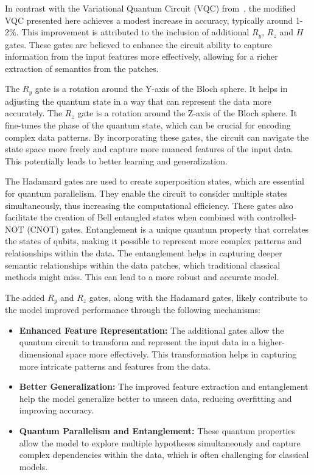 \documentclass[12pt,a4paper]{report}
\begin{document}
In contrast with the Variational Quantum Circuit (VQC) from~\cite{Comajoan_Cara_2024}, the modified VQC presented here achieves a modest increase in accuracy, typically around 1-2\%. This improvement is attributed to the inclusion of additional \( R_y \), \( R_z \) and \( H \) gates. These gates are believed to enhance the circuit ability to capture information from the input features more effectively, allowing for a richer extraction of semantics from the patches.

The \( R_y \) gate is a rotation around the Y-axis of the Bloch sphere. It helps in adjusting the quantum state in a way that can represent the data more accurately.
The \( R_z \) gate is a rotation around the Z-axis of the Bloch sphere. It fine-tunes the phase of the quantum state, which can be crucial for encoding complex data patterns.
By incorporating these gates, the circuit can navigate the state space more freely and capture more nuanced features of the input data. This potentially leads to better learning and generalization.

The Hadamard gates are used to create superposition states, which are essential for quantum parallelism. They enable the circuit to consider multiple states simultaneously, thus increasing the computational efficiency.
These gates also facilitate the creation of Bell entangled states when combined with controlled-NOT (CNOT) gates. Entanglement is a unique quantum property that correlates the states of qubits, making it possible to represent more complex patterns and relationships within the data.
The entanglement helps in capturing deeper semantic relationships within the data patches, which traditional classical methods might miss. This can lead to a more robust and accurate model.

The added \( R_y \) and \( R_z \) gates, along with the Hadamard gates, likely contribute to the model improved performance through the following mechanisms:
\begin{itemize}
  \item \textbf{Enhanced Feature Representation:} The additional gates allow the quantum circuit to transform and represent the input data in a higher-dimensional space more effectively. This transformation helps in capturing more intricate patterns and features from the data.
  \item \textbf{Better Generalization:} The improved feature extraction and entanglement help the model generalize better to unseen data, reducing overfitting and improving accuracy.
  \item \textbf{Quantum Parallelism and Entanglement:} These quantum properties allow the model to explore multiple hypotheses simultaneously and capture complex dependencies within the data, which is often challenging for classical models.
\end{itemize}
\end{document}
